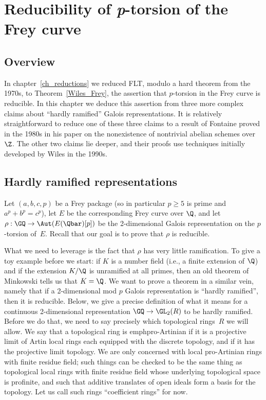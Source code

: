 \chapter{Reducibility of {\it p}-torsion of the Frey curve}\label{ch_freyreduction}

\section{Overview}

In chapter~\ref{ch_reductions} we reduced FLT, modulo a hard theorem from the 1970s,
to Theorem~\ref{Wiles_Frey}, the assertion that $p$-torsion in the Frey
curve is reducible. In this chapter we deduce this assertion from three more complex claims
about ``hardly ramified'' Galois representations. It is relatively straightforward
to reduce one of these three claims to a result of Fontaine proved in the 1980s in his
paper on the nonexistence of nontrivial abelian schemes over $\Z$. The other two
claims lie deeper, and their proofs use techniques initially developed by Wiles in
the 1990s.

\section{Hardly ramified representations}

Let $(a,b,c,p)$ be a Frey package (so in particular $p\geq5$ is prime and $a^p+b^p=c^p$),
let $E$ be the corresponding Frey curve over $\Q$, and let $\rho:\GQ\to\Aut(E(\Qbar)[p])$
be the 2-dimensional Galois representation on the $p$-torsion of~$E$. Recall that our goal
is to prove that $\rho$ is reducible.

What we need to leverage is the fact that $\rho$ has very little ramification. To give
a toy example before we start: if $K$ is a number field (i.e., a finite extension of $\Q$)
and if the extension $K/\Q$ is unramified at all primes, then an old theorem of
Minkowski tells us that $K=\Q$. We want to prove a theorem in a similar vein, namely
that if a 2-dimensional mod $p$ Galois representation is ``hardly ramified'', then it is reducible.
Below, we give a precise
definition of what it means for a continuous 2-dimensional representation $\GQ\to\GL_2(R)$
to be hardly ramified. Before we do that, we need to say precisely which topological rings~$R$
we will allow. We say that a topological ring is emph{pro-Artinian} if it is a projective
limit of Artin local rings each equipped with the discrete topology, and if it has the
projective limit topology. We are only concerned with local pro-Artinian rings with finite
residue field; such things can be checked to be the same thing as topological
local rings with finite residue field whose underlying topological space is profinite,
and such that additive translates of open ideals form a basis for the topology.
Let us call such rings ``coefficient rings'' for now.


